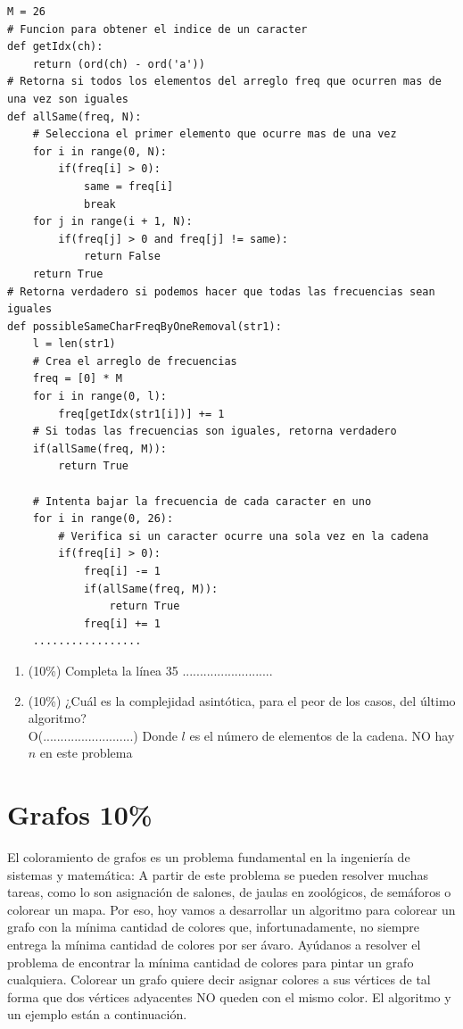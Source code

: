 \documentclass[10 pt]{article}
\begin{document}
{\small
\begin{lstlisting}
M = 26
# Funcion para obtener el indice de un caracter 
def getIdx(ch):
    return (ord(ch) - ord('a')) 
# Retorna si todos los elementos del arreglo freq que ocurren mas de una vez son iguales
def allSame(freq, N):    
    # Selecciona el primer elemento que ocurre mas de una vez
    for i in range(0, N):
        if(freq[i] > 0):
            same = freq[i]
            break   
    for j in range(i + 1, N):
        if(freq[j] > 0 and freq[j] != same):
            return False
    return True
# Retorna verdadero si podemos hacer que todas las frecuencias sean iguales
def possibleSameCharFreqByOneRemoval(str1):
    l = len(str1)
    # Crea el arreglo de frecuencias 
    freq = [0] * M
    for i in range(0, l):
        freq[getIdx(str1[i])] += 1    
    # Si todas las frecuencias son iguales, retorna verdadero
    if(allSame(freq, M)):
        return True
     
    # Intenta bajar la frecuencia de cada caracter en uno  
    for i in range(0, 26):
        # Verifica si un caracter ocurre una sola vez en la cadena
        if(freq[i] > 0):
            freq[i] -= 1
            if(allSame(freq, M)):
                return True
            freq[i] += 1
    .................
\end{lstlisting}
}

\begin{enumerate}[label=(\Alph*)]
  \item (10\%) Completa la línea 35 ..........................
  \item (10\%) ¿Cuál es la complejidad asintótica, para el peor de los casos, del último algoritmo? \\
  O(..........................) Donde $l$ es el número de elementos de la cadena. NO hay $n$ en este problema
\end{enumerate}


\newpage


\section{Grafos 10\%}

  El coloramiento de grafos es un problema fundamental en la ingeniería de sistemas y matemática: A partir de este problema se pueden resolver muchas tareas, como lo son asignación de salones, de jaulas en zoológicos, de semáforos o colorear un mapa. Por eso, hoy vamos a desarrollar un algoritmo para colorear un grafo con la mínima cantidad de colores que, infortunadamente, no siempre entrega la mínima cantidad de colores por ser ávaro. Ayúdanos a resolver el problema de encontrar la mínima cantidad de colores para pintar un grafo cualquiera. Colorear un grafo quiere decir asignar colores a sus vértices de tal forma que dos vértices adyacentes  NO queden con el mismo color. El algoritmo y un ejemplo están a continuación.
\end{document}
